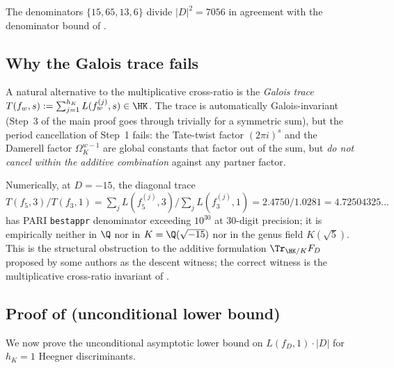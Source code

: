 The denominators $\{15, 65, 13, 6\}$ divide $|D|^2 = 7056$ in
agreement with the denominator bound of .

\subsection{Why the Galois trace fails}\label{ss:trace-fails}

A natural alternative to the multiplicative cross-ratio is the
\emph{Galois trace}
$T(f_w, s) := \sum_{j=1}^{h_K} L(f_w^{(j)}, s) \in \HK$. The
trace is automatically Galois-invariant (Step~3 of the main
proof goes through trivially for a symmetric sum), but the
period cancellation of Step~1 fails: the Tate-twist factor
$(2\pi i)^s$ and the Damerell factor $\Omega_K^{w-1}$ are global
constants that factor out of the sum, but \emph{do not cancel
within the additive combination} against any partner factor.

Numerically, at $D = -15$, the diagonal trace
$T(f_5, 3)/T(f_3, 1) = \sum_j L(f_5^{(j)}, 3) / \sum_j L(f_3^{(j)},
1) = 2.4750/1.0281 = 4.72504325\dots$ has PARI \texttt{bestappr}
denominator exceeding $10^{30}$ at $30$-digit precision; it is
empirically neither in $\Q$ nor in $K = \Q(\sqrt{-15})$ nor in
the genus field $K(\sqrt{5})$. This is the structural
obstruction to the additive formulation $\Tr_{\HK/K} F_D$
proposed by some authors as the descent witness; the correct
witness is the multiplicative cross-ratio invariant of
.

\subsection{Proof of  (unconditional lower bound)}
\label{ss:T2-proof}

We now prove the unconditional asymptotic lower bound on
$L(f_D, 1) \cdot |D|$ for $h_K = 1$ Heegner discriminants.

